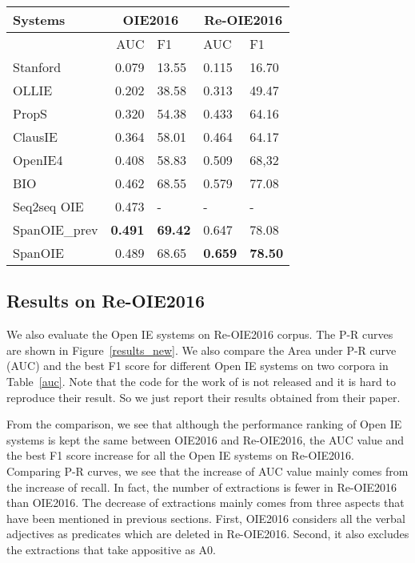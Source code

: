\documentclass[letterpaper]{article} \usepackage{aaai20}  \usepackage{times}  \usepackage{helvet} \usepackage{courier}  \usepackage[hyphens]{url}  \urlstyle{rm} \def\UrlFont{\rm}  \usepackage{graphicx}  \frenchspacing  \setlength{\pdfpagewidth}{8.5in}  \setlength{\pdfpageheight}{11in}
\begin{document}
\begin{table*}[t!]
\begin{center}
\begin{tabular}{|l|rl|ll|}

\hline \textbf{Systems} & \multicolumn{2}{|c|}{\textbf{OIE2016}} & \multicolumn{2}{|c|}{\textbf{Re-OIE2016}} \\ \hline
& AUC & F1 &AUC &F1 \\
\hline
Stanford \cite{Angeli2015LeveragingLS} & 0.079 & 13.55& 0.115 & 16.70\\
OLLIE \cite{Mausam2012OpenLL} & 0.202 &38.58 & 0.313 & 49.47\\
PropS \cite{Stanovsky2016GettingMO} & 0.320 & 54.38& 0.433 & 64.16\\
ClausIE \cite{Corro2013ClausIECO} & 0.364 & 58.01& 0.464 & 64.17\\
OpenIE4 \cite{Mausam2016OpenIE} & 0.408 & 58.83& 0.509 & 68,32\\
\hline
BIO & 0.462 & 68.55 & 0.579 & 77.08\\
Seq2seq OIE \cite{Cui2018NeuralOI} & 0.473 & - & - & - \\
SpanOIE\_prev  &\textbf{0.491} & \textbf{69.42}& 0.647 & 78.08\\
SpanOIE & 0.489 & 68.65& \textbf{0.659} & \textbf{78.50}\\
\hline
\end{tabular}
\end{center}
\caption{\label{auc} AUC and the highest F1 score for different Open IE systems for OIE2016 and Re-OIE2016. SpanOIE\_prev is the model trained from the extractions with confidence score higher than 0.9 of OpenIE4. The rest settings are the same as SpanOIE.}
\end{table*}

\subsection{Results on Re-OIE2016}
We also evaluate the Open IE systems on Re-OIE2016 corpus. The P-R curves are shown in Figure~\ref{results_new}. We also compare the Area under P-R curve (AUC) and the best F1 score for different Open IE systems on two corpora in Table~\ref{auc}. Note that the code for the work of \cite{Cui2018NeuralOI} is not released and it is hard to reproduce their result. So we just report their results obtained from their paper. 

From the comparison, we see that although the performance ranking of Open IE systems is kept the same between OIE2016 and Re-OIE2016, the AUC value and the best F1 score increase for all the Open IE systems on Re-OIE2016. Comparing P-R curves, we see that the increase of AUC value mainly comes from the increase of recall. In fact, the number of extractions is fewer in Re-OIE2016 than OIE2016. The decrease of extractions mainly comes from three aspects that have been mentioned in previous sections. First, OIE2016 considers all the verbal adjectives as predicates which are deleted in Re-OIE2016. Second, it also excludes the extractions that take appositive as A0. 
\end{document}
